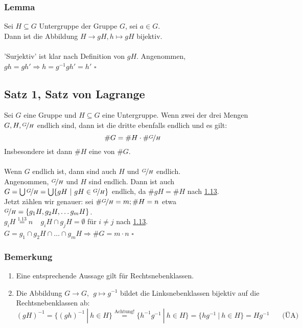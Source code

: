 \subsubsection*{Lemma}
Sei $H\subseteq G$ Untergruppe der Gruppe $G$, sei $a \in G$.\\
Dann ist die Abbildung $H \to gH, h \mapsto gH$ bijektiv.\\

\\
'Surjektiv' ist klar nach Definition von $gH$. Angenommen, $gh=gh' \Rightarrow h=g^{-1}gh'=h'$
\hfill $\square$

\subsection{Satz 1, Satz von Lagrange}
\label{sub:satz_von_lagrange}
Sei $G$ eine Gruppe und $H\subseteq G$ eine Untergruppe. Wenn zwei der drei Mengen $G,H,\nicefrac{G}{H}$ endlich sind, dann ist die dritte ebenfalls endlich und es gilt:\\
\[\#G=\#H \cdot \#\nicefrac{G}{H} \]
Insbesondere ist dann $\#H$ eine  von $\#G$.\\
\vfill
{}\\
Wenn $G$ endlich ist, dann sind auch $H$ und $\nicefrac{G}{H}$ endlich.\\
Angenommen, $\nicefrac{G}{H}$ und $H$ sind endlich. Dann ist auch $G= \bigcup \nicefrac{G}{H}=\bigcup\{gH~|~gH\in \nicefrac{G}{H} \}$ endlich, da $\#gH=\#H$ nach \hyperref[sub:nebenklassen]{1.13}.\\
Jetzt zählen wir genauer: sei $\#\nicefrac{G}{H}=m; \#H=n$ etwa $\nicefrac{G}{H}=\{g_1H,g_2H,\dots g_mH \}$.\\
$g_iH\stackrel{\hyperref[sub:nebenklassen]{1.13}}{=}n~~~~~g_iH\cap g_jH=\emptyset$ für $i\not=j$ nach \hyperref[sub:nebenklassen]{1.13}.\\
$G=g_1\cap g_2H\cap \dots \cap g_mH \Rightarrow \#G=m\cdot n$
\hfill $\square$

\subsubsection*{Bemerkung}
\begin{enumerate}[(1)]
	\item Eine entsprechende Aussage gilt für Rechtsnebenklassen.
	\item Die Abbildung $G \to G,~~g\mapsto g^{-1}$ bildet die Linksnebenklassen bijektiv auf die Rechtsnebenklassen ab:
	\[
	(gH)^{-1}=\{(gh)^{-1}~|~h \in H \} \stackrel{\text{Achtung!}}{=}\{h^{-1}g^{-1}~|~h \in H \}=\{hg^{-1}~|~h\in H \}=Hg^{-1}~~~~~~~~\text{(ÜA)}
	\]
\end{enumerate}

